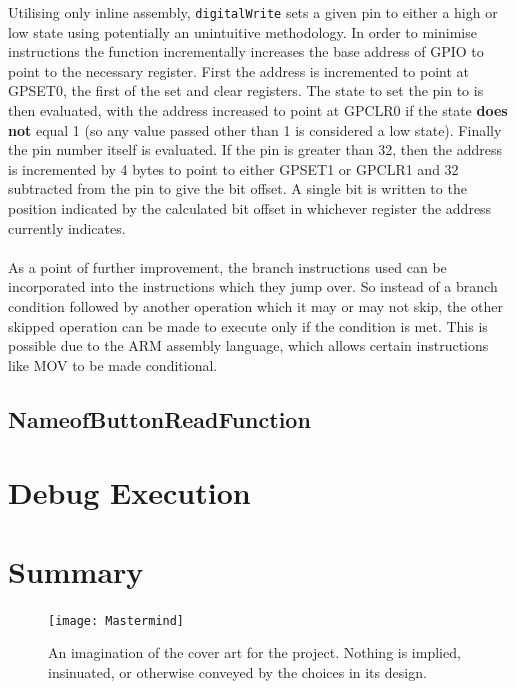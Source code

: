 \documentclass[a4paper, titlepage]{article}
\begin{document}
Utilising only inline assembly, \texttt{digitalWrite} sets a given pin to either a high or low state using potentially an unintuitive methodology. In order to minimise instructions the function incrementally increases the base address of GPIO to point to the necessary register. First the address is incremented to point at GPSET0, the first of the set and clear registers. The state to set the pin to is then evaluated, with the address increased to point at GPCLR0 if the state \textbf{does not} equal 1 (so any value passed other than 1 is considered a low state). Finally the pin number itself is evaluated. If the pin is greater than 32, then the address is incremented by 4 bytes to point to either GPSET1 or GPCLR1 and 32 subtracted from the pin to give the bit offset. A single bit is written to the position indicated by the calculated bit offset in whichever register the address currently indicates.
\\ \\
As a point of further improvement, the branch instructions used can be incorporated into the instructions which they jump over. So instead of a branch condition followed by another operation which it may or may not skip, the other skipped operation can be made to execute only if the condition is met. This is possible due to the ARM assembly language, which allows certain instructions like MOV to be made conditional.


\subsection{NameofButtonReadFunction}

\section{Debug Execution}

\section{Summary}


\begin{figure}
	\centering
	\texttt{[image: Mastermind]}
	\caption{An imagination of the cover art for the project. Nothing is implied, insinuated, or otherwise conveyed by the choices in its design.}
\end{figure}
\end{document}
